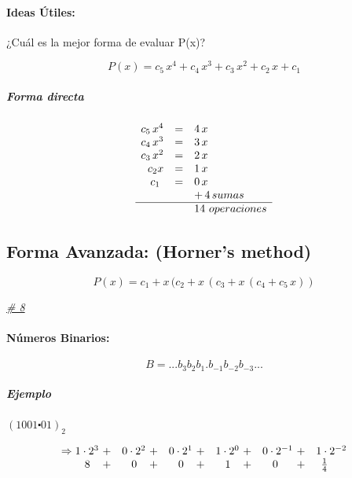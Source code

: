 
\paragraph{Ideas Útiles:}
\begin{center}
¿Cuál es la mejor forma de evaluar P(x)?
\end{center}

$$
P(x) = c_{5} \, x^{4} + c_{4} \, x^{3} + c_{3} \, x^{2} + c_{2} \, x + c_{1}
$$
\subparagraph{Forma directa}

$$
\begin{array}{rcl}
c_{5} \, x^{4}  & = &4\,x \\
c_{4} \, x^{3}  & = &3\,x \\
c_{3} \, x^{2}  & = &2\,x \\
c_{2}    x      & = &1\,x \\
c_{1} \, \,     & = &0\,x \\
              &   &+\,4\,sumas\\ \hline
              &   &14\ operaciones
                   
\end{array}
$$

\subsection{Forma Avanzada: (Horner's method)}

$$ 
P(x) = c_{	1} + x \, (c_{2} + x \, (c_{3} + x \, (c_{4} + c_{5} \, x))
$$

\begin{center}
\emph{\underline{\# 8}}
\end{center}

\paragraph{Números Binarios:}

$$
B = ... b_{3} b_{2} b_{1} . b_{-1} b_{-2} b_{-3}...
$$

\subparagraph{Ejemplo}
\begin{center}
$(1001\centerdot01)_{2}$	
\end{center}

$$
\begin{array}{rrrrrr}
\Rightarrow 1 \cdot 2^{3}\ + & 0 \cdot 2^{2}\ + & 0 \cdot 2^{1}\ + & 1 \cdot 2^{0}\ + & 0 \cdot 2^{-1}\ + & 1 \cdot 2^{-2}\\
8\hspace{4mm} + & 0\hspace{4mm} + & 0\hspace{4mm} + & 1\hspace{4mm} + & 0\hspace{6mm} + & \frac{1}{4}\hspace{6mm} \\ 
\end{array}
$$

